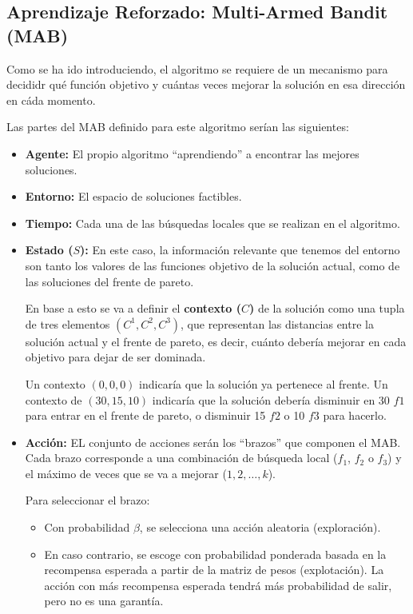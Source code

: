 \documentclass[12pt,a4paper]{book}
\begin{document}
\subsection{Aprendizaje Reforzado: Multi-Armed Bandit (MAB)}
Como se ha ido introduciendo, el algoritmo se requiere de un mecanismo para decididr qué función objetivo y cuántas veces mejorar la solución en esa dirección en cáda momento. 

Las partes del MAB definido para este algoritmo serían las siguientes:

\begin{itemize}
    \item\textbf{Agente:} El propio algoritmo ``aprendiendo'' a encontrar las mejores soluciones.
    \item \textbf{Entorno:} El espacio de soluciones factibles.
    \item \textbf{Tiempo:} Cada una de las búsquedas locales que se realizan en el algoritmo.
    \item \textbf{Estado ($S$):} En este caso, la información relevante que tenemos del entorno son tanto los valores de las funciones objetivo de la solución actual, como de las soluciones del frente de pareto.
    
    En base a esto se va a definir el \textbf{contexto ($C$)} de la solución como una tupla de tres elementos $(C^1, C^2, C^3)$, que representan las distancias entre la solución actual y el frente de pareto, es decir,
    cuánto debería mejorar en cada objetivo para dejar de ser dominada.

    Un contexto $(0,0,0)$ indicaría que la solución ya pertenece al frente. Un contexto de $(30,15,10)$ indicaría que la solución debería disminuir en 30 $f1$ para entrar en el frente de pareto, o disminuir 15 $f2$ o 10 $f3$ para hacerlo.
    \item \textbf{Acción:} EL conjunto de acciones serán los ``brazos'' que componen el MAB. Cada brazo corresponde a una combinación de búsqueda local ($f_1$, $f_2$ o $f_3$) y el máximo de veces que se va a mejorar ($1, 2, \dots, k$).
    
    Para seleccionar el brazo:
        \begin{itemize}
        \item Con probabilidad $\beta$, se selecciona una acción aleatoria (exploración).
        \item En caso contrario, se escoge con probabilidad ponderada basada en la recompensa esperada a partir de la matriz de pesos (explotación). La acción con más recompensa esperada tendrá más probabilidad de salir, pero no es una garantía.
        

\end{itemize}
\end{itemize}
\end{document}
